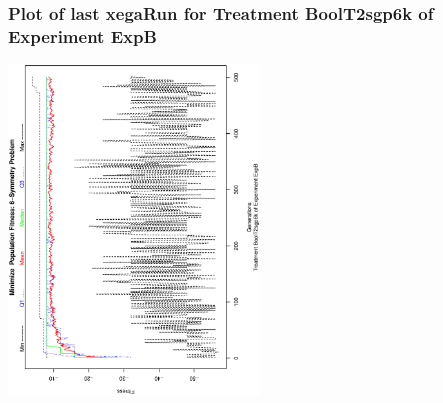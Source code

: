  \begin{frame}
 \frametitle{ Plot of last xegaRun for Treatment BoolT2sgp6k of Experiment ExpB }
 \begin{center}
\includegraphics[width=0.5\textwidth, angle=-90]
{ExpBPlotPopStatsFigure014.eps}
 \end{center}
 \label{report/ExpBPlotPopStatsFigure014.eps}  
 \end{frame}

